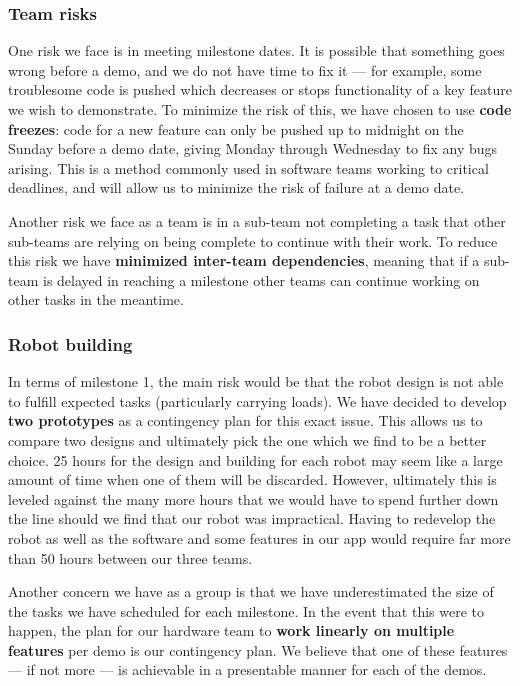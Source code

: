 \documentclass{article}
\begin{document}
\subsubsection{Team risks}

One risk we face is in meeting milestone dates. It is possible that something goes wrong before a demo, and we do not have time to fix it --- for example, some troublesome code is pushed which decreases or stops functionality of a key feature we wish to demonstrate. To minimize the risk of this, we have chosen to use {\bf code freezes}: code for a new feature can only be pushed up to midnight on the Sunday before a demo date, giving Monday through Wednesday to fix any bugs arising. This is a method commonly used in software teams working to critical deadlines, and will allow us to minimize the risk of failure at a demo date.

Another risk we face as a team is in a sub-team not completing a task that other sub-teams are relying on being complete to continue with their work. To reduce this risk we have {\bf minimized inter-team dependencies}, meaning that if a sub-team is delayed in reaching a milestone other teams can continue working on other tasks in the meantime. 

\subsubsection{Robot building}

In terms of milestone 1, the main risk would be that the robot design is not able to fulfill expected tasks (particularly carrying loads). We have decided to develop {\bf two prototypes} as a contingency plan for this exact issue. This allows us to compare two designs and ultimately pick the one which we find to be a better choice. 25 hours for the design and building for each robot may seem like a large amount of time when one of them will be discarded. However, ultimately this is leveled against the many more hours that we would have to spend further down the line should we find that our robot was impractical. Having to redevelop the robot as well as the software and some features in our app would require far more than 50 hours between our three teams.

Another concern we have as a group is that we have underestimated the size of the tasks we have scheduled for each milestone. In the event that this were to happen, the plan for our hardware team to {\bf work linearly on multiple features} per demo is our contingency plan. We believe that one of these features --- if not more --- is achievable in a presentable manner for each of the demos.
\end{document}
